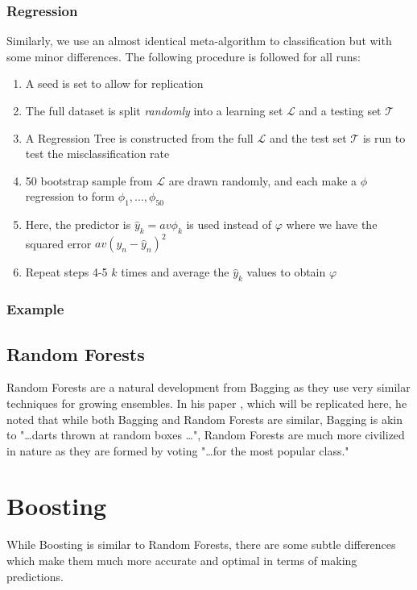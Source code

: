 \documentclass[11pt,a4paper]{report}
\begin{document}
\subsection{Regression}
Similarly, we use an almost identical meta-algorithm to classification but with some minor differences.
The following procedure is followed for all runs:
\begin{enumerate}
    \item A seed is set to allow for replication
    
    \item The full dataset is split \textit{randomly} into a learning set $\mathcal{L}$ and a testing set $\mathcal{T}$
    
    \item A Regression Tree is constructed from the full $\mathcal{L}$ and the test set $\mathcal{T}$ is run to test the misclassification rate
    
    \item 50 bootstrap sample from $\mathcal{L}$ are drawn randomly, and each make a $\phi$ regression to form $\phi_1, \dots, \phi_{50}$
    
    \item Here, the predictor is $\hat{y}_k = av\phi_k$ is used instead of $\varphi$ where we have the squared error $av(y_n - \hat{y}_n)^2$
    
    \item Repeat steps 4-5 $k$ times and average the $\hat{y}_k$ values to obtain $\varphi$
\end{enumerate}

\subsection{Example}

\section{Random Forests}
Random Forests are a natural development from Bagging as they use very similar techniques for growing ensembles. 
In his paper \cite{randomforest}, which will be replicated here, he noted that while both Bagging and Random Forests are similar, Bagging is akin to "\dots darts thrown at random boxes \dots", Random Forests are much more civilized in nature as they are formed by voting "\dots for the most popular class."


\chapter{Boosting}
While Boosting is similar to Random Forests, there are some subtle differences which make them much more accurate and optimal in terms of making predictions.
\end{document}
